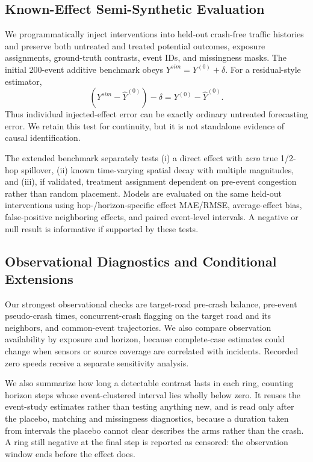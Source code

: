 \documentclass[sigconf,nonacm]{acmart}
\begin{document}
\subsection{Known-Effect Semi-Synthetic Evaluation}
We programmatically inject interventions into held-out crash-free
traffic histories and preserve both untreated and treated potential
outcomes, exposure assignments, ground-truth contrasts, event IDs,
and missingness masks. The initial 200-event additive benchmark obeys
$Y^{sim}=Y^{(0)}+\delta$. For a residual-style estimator,
\begin{equation}
 (Y^{sim}-\widehat Y^{(0)})-\delta
  =Y^{(0)}-\widehat Y^{(0)}.
 \label{eq:identity}
\end{equation}
Thus individual injected-effect error can be exactly ordinary
untreated forecasting error. We retain this test for continuity, but
it is not standalone evidence of causal identification.

The extended benchmark separately tests (i) a direct effect with
\emph{zero} true 1/2-hop spillover, (ii) known time-varying spatial
decay with multiple magnitudes, and (iii), if validated, treatment
assignment dependent on pre-event congestion rather than random
placement. Models are evaluated on the same held-out interventions
using hop-/horizon-specific effect MAE/RMSE, average-effect bias,
false-positive neighboring effects, and paired event-level intervals.
A negative or null result is informative if supported by these tests.

\subsection{Observational Diagnostics and Conditional Extensions}
Our strongest observational checks are target-road pre-crash balance,
pre-event pseudo-crash times, concurrent-crash flagging on the target road
and its neighbors, and common-event trajectories. We also
compare observation availability by exposure and horizon, because
complete-case estimates could change when sensors or source coverage
are correlated with incidents. Recorded zero speeds receive a
separate sensitivity analysis.

We also summarize how long a detectable contrast lasts in each ring,
counting horizon steps whose event-clustered interval lies wholly below
zero. It reuses the event-study estimates rather than testing anything
new, and is read only after the placebo, matching and missingness
diagnostics, because a duration taken from intervals the placebo cannot
clear describes the arms rather than the crash. A ring still negative at
the final step is reported as censored: the observation window ends
before the effect does.
\end{document}
